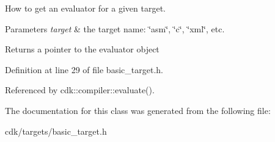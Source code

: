 How to get an evaluator for a given target. 
\begin{DoxyParams}{Parameters}
{\em target} & the target name\+: \char`\"{}asm\char`\"{}, \char`\"{}c\char`\"{}, \char`\"{}xml\char`\"{}, etc. \\
\hline
\end{DoxyParams}
\begin{DoxyReturn}{Returns}
a pointer to the evaluator object 
\end{DoxyReturn}


Definition at line 29 of file basic\+\_\+target.\+h.



Referenced by cdk\+::compiler\+::evaluate().



The documentation for this class was generated from the following file\+:\begin{DoxyCompactItemize}
\item 
cdk/targets/basic\+\_\+target.\+h\end{DoxyCompactItemize}
